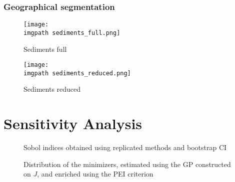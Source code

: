 \documentclass[../../Main_ManuscritThese.tex]{subfiles}
\newcommand\imgpath{/home/victor/acadwriting/Manuscrit/Text/Chapter5/img/}
\begin{document}
\subsubsection{Geographical segmentation}
\begin{figure}[ht]
  \centering
  \texttt{[image: \\imgpath sediments\_full.png]}
  \caption{\label{fig:sediments_full} Sediments full}
\end{figure}

\begin{figure}[ht]
  \centering
  \texttt{[image: \\imgpath sediments\_reduced.png]}
  \caption{\label{fig:sediments_reduced} Sediments reduced}
\end{figure}

\section{Sensitivity Analysis}

\begin{figure}[ht]
  \centering
  
  \caption{\label{fig:sobol_indices} Sobol indices obtained using replicated methods and bootstrap CI}
\end{figure}

\begin{figure}[ht]
  \centering
  
  \caption{\label{fig:dist_minimizers} Distribution of the minimizers, estimated using the GP constructed on $J$, and enriched using the PEI criterion}
\end{figure}







\subfileLocal{
	\pagestyle{empty}
	
	
}
\end{document}
